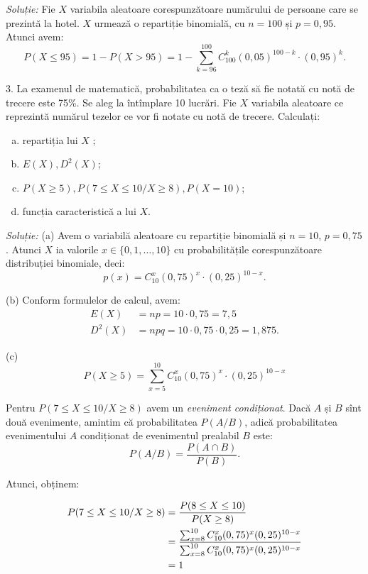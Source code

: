 \documentclass[12pt,a4paper]{article}
\newcommand\ds{\displaystyle}
\theoremstyle{dotless}
\theoremstyle{dotlessdr}
\begin{document}
\emph{Soluție:} Fie $ X $ variabila aleatoare corespunzătoare numărului de persoane
care se prezintă la hotel. $ X $ urmează o repartiție binomială, cu $ n = 100 $ și
$ p = 0,95 $. Atunci avem:
\[
  P(X \leq 95) = 1 - P(X > 95) = %
  1 - \sum_{k = 96}^{100} C_{100}^k (0,05)^{100-k} \cdot (0,95)^k.
\]

\vspace{1cm}

3. La examenul de matematică, probabilitatea ca o teză să fie notată cu notă de
trecere este 75\%. Se aleg la întîmplare 10 lucrări. Fie $ X $ variabila aleatoare
ce reprezintă numărul tezelor ce vor fi notate cu notă de trecere. Calculați:
\begin{enumerate}[(a)]
\item repartiția lui $ X $ ;
\item $ E(X), D^2(X) $;
\item $ P(X \geq 5), P(7 \leq X \leq 10 / X \geq 8), P(X = 10) $;
\item funcția caracteristică a lui $ X $.
\end{enumerate}

\emph{Soluție:} (a) Avem o variabilă aleatoare cu repartiție binomială și $ n = 10 $,
$ p = 0,75 $. Atunci $ X $ ia valorile $ x \in \{0, 1, \dots, 10 \}$ cu probabilitățile
corespunzătoare distribuției binomiale, deci:
\[
  p(x) = C_{10}^x (0,75)^x \cdot (0,25)^{10-x}.
\]

(b) Conform formulelor de calcul, avem:
\begin{align*}
  E(X) &= np = 10 \cdot 0,75 = 7,5 \\
  D^2(X) &= npq = 10 \cdot 0,75 \cdot 0,25 = 1,875.
\end{align*}

(c)
\[
  P(X \geq 5) = \ds\sum_{x = 5}^{10} C_{10}^x (0,75)^x \cdot (0,25)^{10-x}
\]

Pentru $ P(7 \leq X \leq 10 / X \geq 8) $ avem un \emph{eveniment condiționat}.
Dacă $ A $ și $ B $ sînt două evenimente, amintim că probabilitatea $ P(A/B) $,
adică probabilitatea evenimentului $ A $ condiționat de evenimentul prealabil $ B $
este:
\[
  P(A / B) = \frac{P(A \cap B)}{P(B)}.
\]

Atunci, obținem:

\begin{align*}
  P(7 \leq X \leq 10 / X \geq 8) &= \dfrac{P(8 \leq X \leq 10)}{P(X \geq 8)} \\
              &= \frac{\sum_{x = 8}^{10} C_{10}^x (0,75)^x (0,25)^{10-x}}{%
                \sum_{x = 8}^{10} C_{10}^x (0,75)^x (0,25)^{10-x}} \\
              &= 1
\end{align*}
\end{document}
